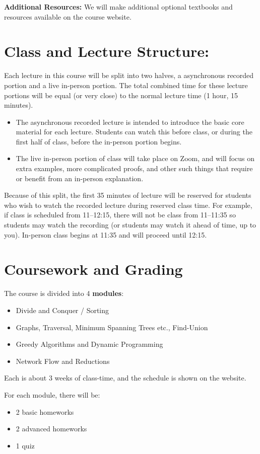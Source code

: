 \documentclass[12pt]{article}
\begin{document}
\textbf{Additional Resources:} We will make additional optional textbooks and resources available on the course website.

\section*{Class and Lecture Structure:}

Each lecture in this course will be split into two halves, a asynchronous recorded portion and a live in-person portion. The total combined time for these lecture portions will be equal (or very close) to the normal lecture time (1 hour, 15 minutes).
\begin{itemize}
\item The asynchronous recorded lecture  is intended to introduce the basic core material for each lecture. Students can watch this before class, or during the first half of class, before the in-person portion begins.
\item The live in-person portion of class will take place on Zoom, and will focus on extra examples, more complicated proofs, and other such things that require or benefit from an in-person explanation.
\end{itemize}
Because of this split, the first 35 minutes of lecture will be reserved for students who wish to watch the recorded lecture during reserved class time. For example, if class is scheduled from 11--12:15, there will not be class from 11--11:35 so students may watch the recording (or students may watch it ahead of time, up to you). In-person class begins at 11:35 and will proceed until 12:15.


\section*{Coursework and Grading}

The course is divided into 4 {\bf modules}:
\begin{itemize}
    \item Divide and Conquer / Sorting
    \item Graphs, Traversal, Minimum Spanning Trees etc., Find-Union
    \item Greedy Algorithms and Dynamic Programming
    \item Network Flow and Reductions
\end{itemize}
Each is about 3 weeks of class-time, and the schedule is shown on the website. 

For each module, there will be:
\begin{itemize}
    \item 2 basic homeworks
    \item 2 advanced homeworks
    \item 1 quiz
\end{itemize}
\end{document}
